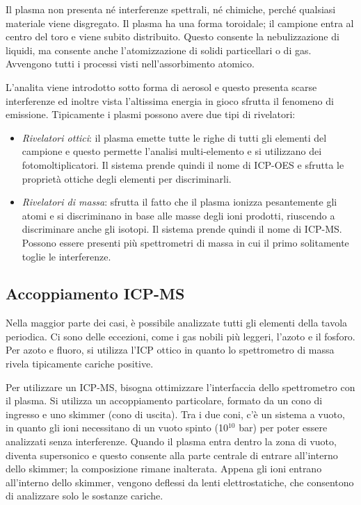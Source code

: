 
Il plasma non presenta né interferenze spettrali, né chimiche, perché qualsiasi materiale viene disgregato.
Il plasma ha una forma toroidale; il campione entra al centro del toro e viene subito distribuito.
Questo consente la nebulizzazione di liquidi, ma consente anche l'atomizzazione di solidi particellari o di gas.
Avvengono tutti i processi visti nell'assorbimento atomico.

L’analita viene introdotto sotto forma di aerosol e questo presenta scarse interferenze ed inoltre vista l'altissima energia in gioco sfrutta il fenomeno di emissione.
Tipicamente i plasmi possono avere due tipi di rivelatori:
\begin{itemize}
\item \textit{Rivelatori ottici}: il plasma emette tutte le righe di tutti gli elementi del campione e questo permette l'analisi multi-elemento e si utilizzano dei fotomoltiplicatori.
Il sistema prende quindi il nome di ICP-OES e sfrutta le proprietà ottiche degli elementi per discriminarli.
\item \textit{Rivelatori di massa}: sfrutta il fatto che il plasma ionizza pesantemente gli atomi e si discriminano in base alle masse degli ioni prodotti, riuscendo a discriminare anche gli isotopi.
Il sistema prende quindi il nome di ICP-MS.
Possono essere presenti più spettrometri di massa in cui il primo solitamente toglie le interferenze.
\end{itemize}

\subsection{Accoppiamento ICP-MS}
Nella maggior parte dei casi, è possibile analizzate tutti gli elementi della tavola periodica.
Ci sono delle eccezioni, come i gas nobili più leggeri, l'azoto e il fosforo.
Per azoto e fluoro, si utilizza l'ICP ottico in quanto lo spettrometro di massa rivela tipicamente cariche positive.


Per utilizzare un ICP-MS, bisogna ottimizzare l'interfaccia dello spettrometro con il plasma.
Si utilizza un accoppiamento particolare, formato da un cono di ingresso e uno skimmer (cono di uscita).
Tra i due coni, c'è un sistema a vuoto, in quanto gli ioni necessitano di un vuoto spinto (10$^{10}$ bar) per poter essere analizzati senza interferenze.
Quando il plasma entra dentro la zona di vuoto, diventa supersonico e questo consente alla parte centrale di entrare all'interno dello skimmer; la composizione rimane inalterata.
Appena gli ioni entrano all'interno dello skimmer, vengono deflessi da lenti elettrostatiche, che consentono di analizzare solo le sostanze cariche.

